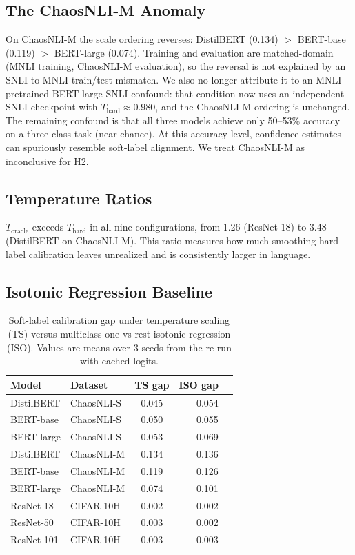 \documentclass[11pt,a4paper]{article}
\theoremstyle{definition}
\begin{document}
\subsection{The ChaosNLI-M Anomaly}
\label{sec:anomaly}

On ChaosNLI-M the scale ordering reverses: DistilBERT (0.134) $>$
BERT-base (0.119) $>$ BERT-large (0.074). Training and evaluation are
matched-domain (MNLI training, ChaosNLI-M evaluation), so the reversal
is not explained by an SNLI-to-MNLI train/test mismatch. We also no
longer attribute it to an MNLI-pretrained BERT-large SNLI confound: that
condition now uses an independent SNLI checkpoint with
$T_{\mathrm{hard}}\approx0.980$, and the ChaosNLI-M ordering is
unchanged. The remaining confound is that all three models achieve only
50--53\% accuracy on a three-class task (near chance). At this accuracy
level, confidence estimates can spuriously resemble soft-label
alignment. We treat ChaosNLI-M as inconclusive for H2.

\subsection{Temperature Ratios}

$T_{\mathrm{oracle}}$ exceeds $T_{\mathrm{hard}}$ in all nine
configurations, from 1.26 (ResNet-18) to 3.48 (DistilBERT on
ChaosNLI-M). This ratio measures how much smoothing hard-label
calibration leaves unrealized and is consistently larger in language.

\subsection{Isotonic Regression Baseline}
\label{sec:isotonic}

\begin{table}[t]
\centering
\caption{Soft-label calibration gap under temperature scaling (TS) versus
multiclass one-vs-rest isotonic regression (ISO). Values are means over
3 seeds from the re-run with cached logits.}
\label{tab:iso}
\begin{tabular}{@{}llcrr@{}}
\toprule
Model & Dataset & TS gap & ISO gap \\
\midrule
DistilBERT & ChaosNLI-S & 0.045 & 0.054 \\
BERT-base  & ChaosNLI-S & 0.050 & 0.055 \\
BERT-large & ChaosNLI-S & 0.053 & 0.069 \\
DistilBERT & ChaosNLI-M & 0.134 & 0.136 \\
BERT-base  & ChaosNLI-M & 0.119 & 0.126 \\
BERT-large & ChaosNLI-M & 0.074 & 0.101 \\
ResNet-18  & CIFAR-10H  & 0.002 & 0.002 \\
ResNet-50  & CIFAR-10H  & 0.003 & 0.002 \\
ResNet-101 & CIFAR-10H  & 0.003 & 0.003 \\
\bottomrule
\end{tabular}
\end{table}
\end{document}
